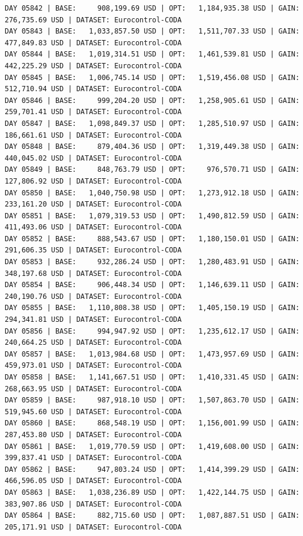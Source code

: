 \documentclass[11pt,a4paper]{article}
\begin{document}
\begin{verbatim}
DAY 05842 | BASE:     908,199.69 USD | OPT:   1,184,935.38 USD | GAIN: 276,735.69 USD | DATASET: Eurocontrol-CODA
DAY 05843 | BASE:   1,033,857.50 USD | OPT:   1,511,707.33 USD | GAIN: 477,849.83 USD | DATASET: Eurocontrol-CODA
DAY 05844 | BASE:   1,019,314.51 USD | OPT:   1,461,539.81 USD | GAIN: 442,225.29 USD | DATASET: Eurocontrol-CODA
DAY 05845 | BASE:   1,006,745.14 USD | OPT:   1,519,456.08 USD | GAIN: 512,710.94 USD | DATASET: Eurocontrol-CODA
DAY 05846 | BASE:     999,204.20 USD | OPT:   1,258,905.61 USD | GAIN: 259,701.41 USD | DATASET: Eurocontrol-CODA
DAY 05847 | BASE:   1,098,849.37 USD | OPT:   1,285,510.97 USD | GAIN: 186,661.61 USD | DATASET: Eurocontrol-CODA
DAY 05848 | BASE:     879,404.36 USD | OPT:   1,319,449.38 USD | GAIN: 440,045.02 USD | DATASET: Eurocontrol-CODA
DAY 05849 | BASE:     848,763.79 USD | OPT:     976,570.71 USD | GAIN: 127,806.92 USD | DATASET: Eurocontrol-CODA
DAY 05850 | BASE:   1,040,750.98 USD | OPT:   1,273,912.18 USD | GAIN: 233,161.20 USD | DATASET: Eurocontrol-CODA
DAY 05851 | BASE:   1,079,319.53 USD | OPT:   1,490,812.59 USD | GAIN: 411,493.06 USD | DATASET: Eurocontrol-CODA
DAY 05852 | BASE:     888,543.67 USD | OPT:   1,180,150.01 USD | GAIN: 291,606.35 USD | DATASET: Eurocontrol-CODA
DAY 05853 | BASE:     932,286.24 USD | OPT:   1,280,483.91 USD | GAIN: 348,197.68 USD | DATASET: Eurocontrol-CODA
DAY 05854 | BASE:     906,448.34 USD | OPT:   1,146,639.11 USD | GAIN: 240,190.76 USD | DATASET: Eurocontrol-CODA
DAY 05855 | BASE:   1,110,808.38 USD | OPT:   1,405,150.19 USD | GAIN: 294,341.81 USD | DATASET: Eurocontrol-CODA
DAY 05856 | BASE:     994,947.92 USD | OPT:   1,235,612.17 USD | GAIN: 240,664.25 USD | DATASET: Eurocontrol-CODA
DAY 05857 | BASE:   1,013,984.68 USD | OPT:   1,473,957.69 USD | GAIN: 459,973.01 USD | DATASET: Eurocontrol-CODA
DAY 05858 | BASE:   1,141,667.51 USD | OPT:   1,410,331.45 USD | GAIN: 268,663.95 USD | DATASET: Eurocontrol-CODA
DAY 05859 | BASE:     987,918.10 USD | OPT:   1,507,863.70 USD | GAIN: 519,945.60 USD | DATASET: Eurocontrol-CODA
DAY 05860 | BASE:     868,548.19 USD | OPT:   1,156,001.99 USD | GAIN: 287,453.80 USD | DATASET: Eurocontrol-CODA
DAY 05861 | BASE:   1,019,770.59 USD | OPT:   1,419,608.00 USD | GAIN: 399,837.41 USD | DATASET: Eurocontrol-CODA
DAY 05862 | BASE:     947,803.24 USD | OPT:   1,414,399.29 USD | GAIN: 466,596.05 USD | DATASET: Eurocontrol-CODA
DAY 05863 | BASE:   1,038,236.89 USD | OPT:   1,422,144.75 USD | GAIN: 383,907.86 USD | DATASET: Eurocontrol-CODA
DAY 05864 | BASE:     882,715.60 USD | OPT:   1,087,887.51 USD | GAIN: 205,171.91 USD | DATASET: Eurocontrol-CODA

\end{verbatim}
\end{document}
